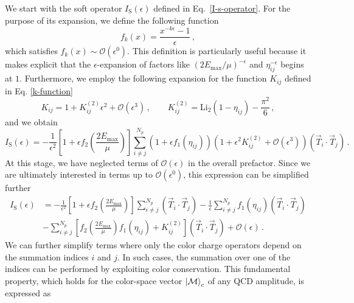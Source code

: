 \documentclass[a4paper, 12pt]{book}
\begin{document}
We start with the soft operator $I_{\mathrm{S}}(\epsilon)$ defined in Eq.~\ref{I-s-operator}. For the purpose of its expansion, we define the following function
\begin{equation}
  f_k(x) = \frac{x^{-k\epsilon}-1}{\epsilon} \, ,
\end{equation}
which satisfies $f_k(x) \sim \mathcal{O}(\epsilon^0) $. This definition is particularly useful because it makes explicit that the $\epsilon$-expansion of factors like $(2E_{\mathrm{max}}/\mu)^{-\epsilon}$ and $\eta_{ij}^{-\epsilon}$ begins at $1$. Furthermore, we employ the following expansion for the function $K_{ij}$ defined in Eq. \ref{k-function}
\begin{equation}
  K_{ij} = 1+ K_{ij}^{(2)} \epsilon^2 + \mathcal{O}(\epsilon^3) \, , \qquad  K_{ij}^{(2)} = \mathrm{Li}_2(1-\eta_{ij}) - \frac{\pi^2}{6} \, , 
\end{equation}
and we obtain 
\begin{equation}
  I_{\mathrm{S}}(\epsilon) = - \frac{1}{\epsilon^2} \left[1+\epsilon f_2 \left(\frac{2 E_{\mathrm{max}}}{\mu}\right)\right] \sum_{i \neq j}^{N_p} (1+\epsilon f_1(\eta_{ij}))(1+ \epsilon^2 K_{ij}^{(2)} + \mathcal{O}(\epsilon^3)) \left( \vec{T}_i \cdot \vec{T}_j\right) \,.
\end{equation}
At this stage, we have neglected terms of $\mathcal{O}(\epsilon)$ in the overall prefactor. Since we are ultimately interested in terms up to $\mathcal{O}(\epsilon^0)$, this expression can be simplified further
\begin{equation}
  \begin{aligned}
   I_{\mathrm{S}}(\epsilon) & = - \frac{1}{\epsilon^2} \left[1+\epsilon f_2 \left(\frac{2 E_{\mathrm{max}} }{\mu}\right)\right] \sum_{i \neq j}^{N_p}\left( \vec{T}_i \cdot \vec{T}_j\right) - \frac{1}{\epsilon} \sum_{i \neq j}^{N_p} f_1(\eta_{ij}) \left( \vec{T}_i \cdot \vec{T}_j\right)  \\
  & - \sum_{i \neq j}^{N_p} \left[f_2 \left(\frac{2 E_{\mathrm{max}} }{\mu}\right) f_1(\eta_{ij}) + K_{ij}^{(2)} \right] \left( \vec{T}_i \cdot \vec{T}_j\right) + \mathcal{O}(\epsilon) \, . 
  \end{aligned}
\end{equation}
We can further simplify terms where only the color charge operators depend on the summation indices $i$ and $j$. In such cases, the summation over one of the indices can be performed by exploiting color conservation. This fundamental property, which holds for the color-space vector $\ket{\mathcal{M}}_c$ of any QCD amplitude, is expressed as
\end{document}
